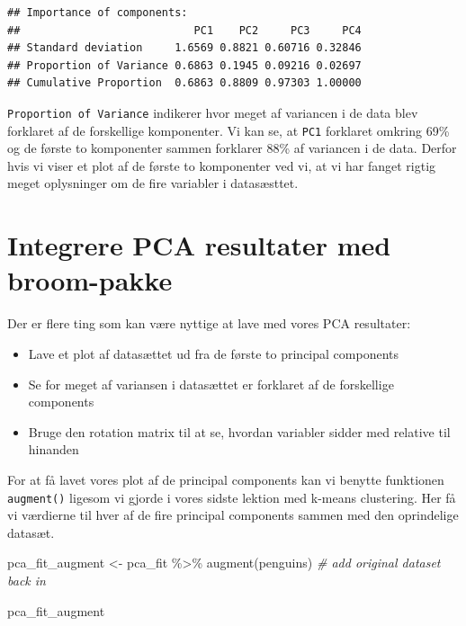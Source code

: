 \documentclass[
]{book}
\newenvironment{Shaded}{\begin{snugshade}}{\end{snugshade}}
\newcommand{\CommentTok}[1]{\textcolor[rgb]{0.56,0.35,0.01}{\textit{#1}}}
\newcommand{\FunctionTok}[1]{\textcolor[rgb]{0.00,0.00,0.00}{#1}}
\newcommand{\NormalTok}[1]{#1}
\newcommand{\OtherTok}[1]{\textcolor[rgb]{0.56,0.35,0.01}{#1}}
\newcommand{\SpecialCharTok}[1]{\textcolor[rgb]{0.00,0.00,0.00}{#1}}
\providecommand{\tightlist}{%
  \setlength{\itemsep}{0pt}\setlength{\parskip}{0pt}}
\begin{document}
\begin{verbatim}
## Importance of components:
##                           PC1    PC2     PC3     PC4
## Standard deviation     1.6569 0.8821 0.60716 0.32846
## Proportion of Variance 0.6863 0.1945 0.09216 0.02697
## Cumulative Proportion  0.6863 0.8809 0.97303 1.00000
\end{verbatim}

\texttt{Proportion\ of\ Variance} indikerer hvor meget af variancen i de data blev forklaret af de forskellige komponenter. Vi kan se, at \texttt{PC1} forklaret omkring 69\% og de første to komponenter sammen forklarer 88\% af variancen i de data. Derfor hvis vi viser et plot af de første to komponenter ved vi, at vi har fanget rigtig meget oplysninger om de fire variabler i datasæsttet.

\hypertarget{integrere-pca-resultater-med-broom-pakke}{%
\section{Integrere PCA resultater med broom-pakke}\label{integrere-pca-resultater-med-broom-pakke}}

Der er flere ting som kan være nyttige at lave med vores PCA resultater:

\begin{itemize}
\tightlist
\item
  Lave et plot af datasættet ud fra de første to principal components
\item
  Se for meget af variansen i datasættet er forklaret af de forskellige components
\item
  Bruge den rotation matrix til at se, hvordan variabler sidder med relative til hinanden
\end{itemize}

For at få lavet vores plot af de principal components kan vi benytte funktionen \texttt{augment()} ligesom vi gjorde i vores sidste lektion med k-means clustering. Her få vi værdierne til hver af de fire principal components sammen med den oprindelige datasæt.

\begin{Shaded}
\begin{Highlighting}[]
\NormalTok{pca\_fit\_augment }\OtherTok{\textless{}{-}}\NormalTok{ pca\_fit }\SpecialCharTok{\%\textgreater{}\%} 
  \FunctionTok{augment}\NormalTok{(penguins) }\CommentTok{\# add original dataset back in}

\NormalTok{pca\_fit\_augment}
\end{Highlighting}
\end{Shaded}
\end{document}
